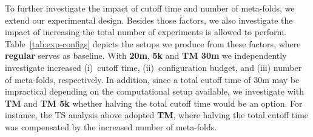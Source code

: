 To further investigate the impact of cutoff time and number of meta-folds, we extend our experimental design. Besides those factors, we also investigate the impact of increasing the total number of experiments \irace is allowed to perform. 
%
Table~\ref{tab:exp-configs} depicts the setups we produce from these factors, where \textbf{regular} serves as baseline. With \textbf{20m}, \textbf{5k} and \textbf{TM 30m} we independently investigate increased (i)~cutoff time, (ii)~configuration budget, and (iii) number of meta-folds, respectively. In addition, since a total cutoff time of 30m may be impractical depending on the computational setup available, we investigate with \textbf{TM} and \textbf{TM 5k} whether halving the total cutoff time would be an option. For instance, the TS analysis above adopted \textbf{TM}, where halving the total cutoff time was compensated by the increased number of meta-folds.



